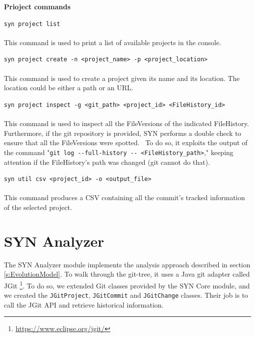 \textbf{Prioject commands}


\lstinline{syn project list}\\
\\
This command is used to print a list of available projects in the console.


\lstinline{syn project create -n <project_name> -p <project_location>}\\
\\
This command is used to create a project given its name and its location. The location could be either a path or an URL. 


\lstinline{syn project inspect -g <git_path> <project_id> <FileHistory_id>}\\
\\
This command is used to inspect all the FileVersions of the indicated FileHistory. Furthermore, if the git repository is provided, SYN performs a double check to ensure that all the FileVersions were spotted. \
To do so, it exploits the output of the command "\lstinline{git log --full-history -- <FileHistory_path>}," keeping attention if the FileHistory's path was changed (git cannot do that).


\lstinline{syn util csv <project_id> -o <output_file>}\\
\\
This command produces a CSV containing all the commit's tracked information of the selected project. 


\section{SYN Analyzer}
\label{sec:SYNAnalyzer}
The SYN Analyzer module implements the analysis approach described in section \ref{s:EvolutionModel}.
To walk through the git-tree, it uses a Java git adapter called JGit \footnote{\url{https://www.eclipse.org/jgit/}}. 
To do so, we extended Git classes provided by the SYN Core module, and we created the \texttt{JGitProject}, \texttt{JGitCommit} and \texttt{JGitChange} classes. Their job is to call the JGit API and retrieve historical information. 


